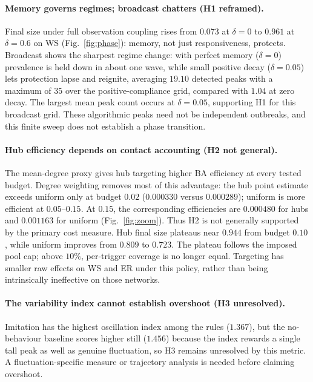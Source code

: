 \documentclass[11pt,a4paper]{article}
\begin{document}
\paragraph{Memory governs regimes; broadcast chatters (H1 reframed).}
Final size under full observation coupling rises from $0.073$ at $\delta=0$
to $0.961$ at $\delta=0.6$ on WS (Fig.~\ref{fig:phase}): memory, not just
responsiveness, protects. Broadcast shows the sharpest regime change: with
perfect memory ($\delta=0$) prevalence is held down in about one wave, while
small positive decay ($\delta=0.05$) lets protection lapse and reignite,
averaging $19.10$ detected peaks with a maximum of $35$ over the
positive-compliance grid, compared with $1.04$ at zero decay. The largest
mean peak count occurs at $\delta=0.05$, supporting H1 for this broadcast
grid. These algorithmic peaks need not be independent outbreaks, and this
finite sweep does not establish a phase transition.

\paragraph{Hub efficiency depends on contact accounting (H2 not general).}
The mean-degree proxy gives hub targeting higher BA efficiency at every
tested budget. Degree weighting removes most of this advantage: the hub
point estimate exceeds uniform only at budget $0.02$ ($0.000330$ versus
$0.000289$); uniform is more efficient at $0.05$--$0.15$.
At $0.15$, the corresponding efficiencies are $0.000480$ for hubs and
$0.001163$ for uniform (Fig.~\ref{fig:zoom}). Thus H2 is not generally
supported by the primary cost measure. Hub final size plateaus near $0.944$
from budget $0.10$, while uniform improves from $0.809$ to $0.723$.
The plateau follows the imposed pool cap; above $10\%$, per-trigger coverage
is no longer equal. Targeting has smaller raw effects on WS and ER under
this policy, rather than being intrinsically ineffective on those networks.

\paragraph{The variability index cannot establish overshoot (H3 unresolved).}
Imitation has the highest oscillation index among the rules ($1.367$), but
the no-behaviour baseline scores higher still ($1.456$) because the index
rewards a single tall peak as well as genuine fluctuation, so H3 remains
unresolved by this metric. A fluctuation-specific measure or trajectory
analysis is needed before claiming overshoot.
\end{document}

